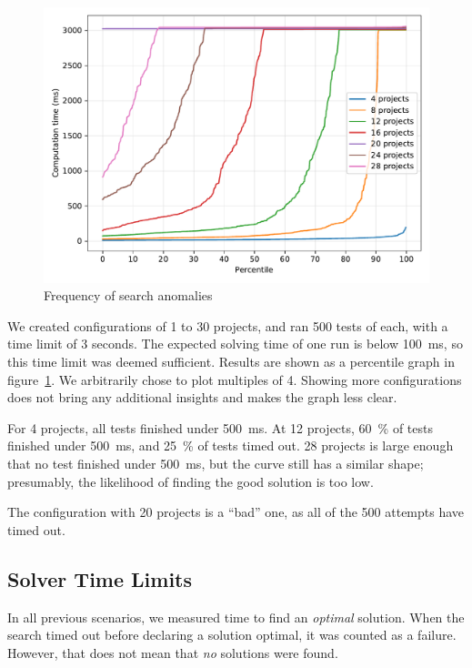 \begin{figure}[ht]
    \centering
    \includegraphics[width=1\linewidth]{img/badsolver.pdf}
    \caption{Frequency of search anomalies}
    \label{fig:badsolver}
\end{figure}

We created configurations of 1 to 30 projects, and ran 500 tests of each, with a time
limit of 3 seconds. The expected solving time of one run is below 100~ms, so this time
limit was deemed sufficient. Results are shown as a percentile graph in
figure~\ref{fig:badsolver}. We arbitrarily chose to plot multiples of 4. Showing more
configurations does not bring any additional insights and makes the graph less clear.

For 4 projects, all tests finished under 500~ms. At 12 projects, 60~\% of tests finished
under 500~ms, and 25~\% of tests timed out. 28 projects is large enough that no test
finished under 500~ms, but the curve still has a similar shape; presumably, the
likelihood of finding the good solution is too low.

The configuration with 20 projects is a ``bad'' one, as all of the 500 attempts have
timed out.


\subsection{Solver Time Limits}
\label{eval:example:limits}

In all previous scenarios, we measured time to find an \textit{optimal} solution. When
the search timed out before declaring a solution optimal, it was counted as a failure.
However, that does not mean that \textit{no} solutions were found.

